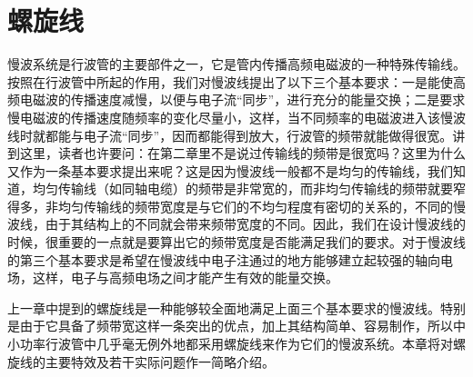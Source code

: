 \chapter{螺旋线} \label{ch3}
慢波系统是行波管的主要部件之一，它是管内传播高频电磁波的一种特殊传输线。按照在行波管中所起的作用，我们对慢波线提出了以下三个基本要求：一是能使高频电磁波的传播速度减慢，以便与电子流“同步”，进行充分的能量交换；二是要求慢电磁波的传播速度随频率的变化尽量小，这样，当不同频率的电磁波进入该慢波线时就都能与电子流“同步”，因而都能得到放大，行波管的频带就能做得很宽。讲到这里，读者也许要问：在第二章里不是说过传输线的频带是很宽吗？这里为什么又作为一条基本要求提出来呢？这是因为慢波线一般都不是均匀的传输线，我们知道，均匀传输线（如同轴电缆）的频带是非常宽的，而非均匀传输线的频带就要窄得多，非均匀传输线的频带宽度是与它们的不均匀程度有密切的关系的，不同的慢波线，由于其结构上的不同就会带来频带宽度的不同。因此，我们在设计慢波线的时候，很重要的一点就是要算出它的频带宽度是否能满足我们的要求。对于慢波线的第三个基本要求是希望在慢波线中电子注通过的地方能够建立起较强的轴向电场，这样，电子与高频电场之间才能产生有效的能量交换。

上一章中提到的螺旋线是一种能够较全面地满足上面三个基本要求的慢波线。特别是由于它具备了频带宽这样一条突出的优点，加上其结构简单、容易制作，所以中小功率行波管中几乎毫无例外地都采用螺旋线来作为它们的慢波系统。本章将对螺旋线的主要特效及若干实际问题作一简略介绍。
